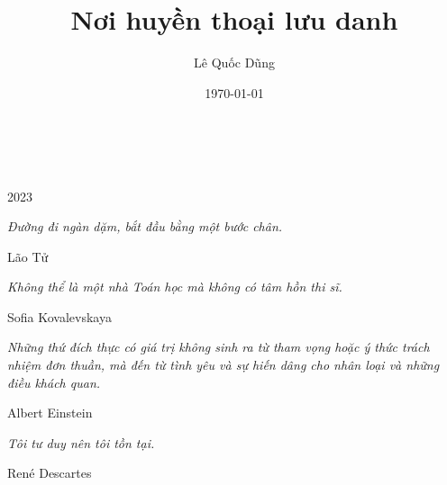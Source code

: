 \documentclass[oneside]{book}
\title{Nơi huyền thoại lưu danh}
\author{Lê Quốc Dũng}
\date{\today}
\begin{document}
\begin{titlepage}
		\\
			
		\vspace{10mm}
		\\
		\vspace{\fill}
		\centering \large{2023}
\end{titlepage}

\newpage

\vspace*{2cm}

\begin{center}
	{\Large 
			\textit{Đường đi ngàn dặm, bắt đầu bằng một bước chân.}
	}
	\Large{\parbox{10cm}{
		\begin{raggedleft}
		\vspace{.5cm}\hfill{Lão Tử}
		\end{raggedleft}
	}
}
\end{center}

\begin{center}
	{\Large 
			\textit{Không thể là một nhà Toán học mà không có tâm hồn thi sĩ.}
	}
	\Large{\parbox{10cm}{
		\begin{raggedleft}
		\vspace{.5cm}\hfill{Sofia Kovalevskaya}
		\end{raggedleft}
	}
}
\end{center}

\begin{center}
	{\Large 
			\textit{Những thứ đích thực có giá trị không sinh ra từ tham
			vọng hoặc ý thức trách nhiệm đơn thuần, mà đến từ tình yêu và
			sự hiến dâng cho nhân loại và những điều khách quan.}
	}
	\Large{\parbox{10cm}{
		\begin{raggedleft}
		\vspace{.5cm}\hfill{Albert Einstein}
		\end{raggedleft}
	}
}
\end{center}

\begin{center}
	{\Large 
			\textit{Tôi tư duy nên tôi tồn tại.}
	}
	\Large{\parbox{10cm}{
		\begin{raggedleft}
		\vspace{.5cm}\hfill{\foreignlanguage{french}{René Descartes}}
		\end{raggedleft}
	}
}
\end{center}
\end{document}
